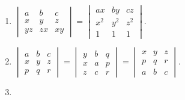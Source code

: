 \begin{enumerate}[resume]
\item $\begin{vmatrix}a & b & c\\x & y & z\\yz & zx & xy\end{vmatrix} = \begin{vmatrix}ax & by & cz\\ x^2 & y^2 & z^2\\ 1 & 1 &
  1\end{vmatrix}$.
\item $\begin{vmatrix}a & b & c\\ x & y & z\\ p & q & r\end{vmatrix} = \begin{vmatrix}y & b & q\\x & a & p\\ z & c & r\end{vmatrix}
  = \begin{vmatrix}x & y & z\\ p & q & r\\ a & b & c\end{vmatrix}$.
\item
\end{enumerate}
